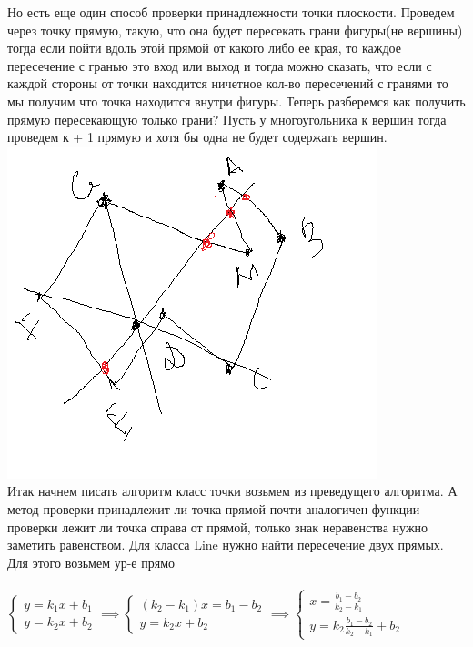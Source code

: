 \documentclass[12pt]{article} %
\begin{document}
 	\hspace*{1cm}Но есть еще один способ проверки принадлежности точки плоскости. Проведем через точку прямую, такую, что она будет пересекать грани фигуры(не вершины) тогда если пойти вдоль этой прямой от какого либо ее края, то каждое пересечение с гранью это вход или выход и тогда можно сказать, что если с каждой стороны от точки находится ничетное кол-во пересечений с гранями то мы получим что точка находится внутри фигуры. Теперь разберемся как получить прямую пересекающую только грани? Пусть у многоугольника к вершин тогда проведем к + 1 прямую и хотя бы одна не будет содержать вершин.\\
 	\includegraphics[scale=0.8]{3}\\
 	\hspace*{1cm}Итак начнем писать алгоритм класс точки возьмем из преведущего алгоритма. А метод проверки принадлежит ли точка прямой почти аналогичен функции проверки лежит ли точка справа от прямой, только знак неравенства нужно заметить равенством. Для класса Line нужно найти пересечение двух прямых. Для этого возьмем ур-е прямо\\\\
 	$\begin{cases}y = k_1 x + b_1\\   y = k_2 x + b_2\end{cases} \implies \begin{cases}(k_2 - k_1) x = b_1 - b_2\\   y = k_2 x + b_2\end{cases}\implies \begin{cases}x =\frac{ b_1 - b_2}{k_2 - k_1}\\   y = k_2 \frac{ b_1 - b_2}{k_2 - k_1} + b_2\end{cases}$
\end{document}
